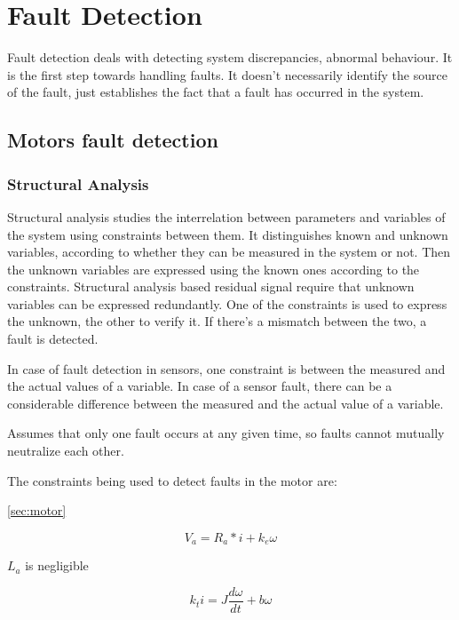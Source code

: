 \chapter{Fault Detection}

Fault detection deals with detecting system discrepancies, abnormal behaviour. It is the first step towards handling faults. It doesn't necessarily identify the source of the fault, just establishes the fact that a fault has occurred in the system.



\section{Motors fault detection}

\label{sec:structural}
\subsection{Structural Analysis}
Structural analysis studies the interrelation between parameters and variables of the system using constraints between them. It distinguishes known and unknown variables, according to whether they can be measured in the system or not. Then the unknown variables are expressed using the known ones according to the constraints. Structural analysis based residual signal require that unknown variables can be expressed redundantly. One of the constraints is used to express the unknown, the other to verify it. If there's a mismatch between the two, a fault is detected.

In case of fault detection in sensors, one constraint is between the measured and the actual values of a variable. In case of a sensor fault, there can be a considerable difference between the measured and the actual value of a variable.

Assumes that only one fault occurs at any given time, so faults cannot mutually neutralize each other. 

The constraints being used to detect faults in the motor are:

\ref{sec:motor} 


\begin{equation}
V_a = R_a * i + k_e \omega
\end{equation}

$L_a$ is negligible

\begin{equation}
k_{t}i  =J\dfrac{d\omega}{dt} + b\omega
\end{equation}

